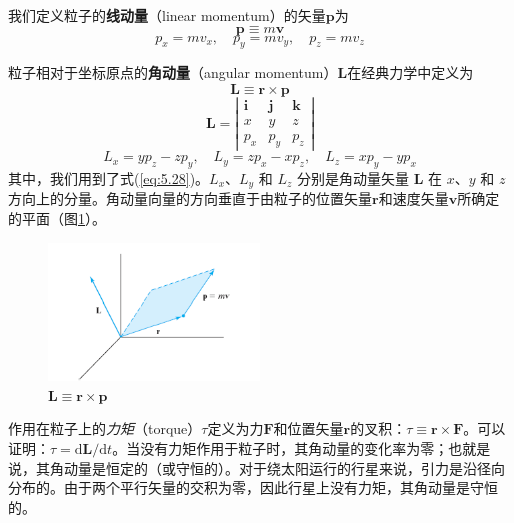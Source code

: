     我们定义粒子的\textbf{线动量}（linear momentum）的矢量$\mathbf{p}$为
    \begin{equation}
        \boxed{
            \mathbf{p} \equiv m\mathbf{v}
        }
        \label{eq:5.35}
    \end{equation}
    \begin{equation}
        p_x = mv_x, \quad p_y = mv_y, \quad p_z = mv_z
        \label{eq:5.36}
    \end{equation}

    粒子相对于坐标原点的\textbf{角动量}（angular momentum）$\mathbf{L}$在经典力学中定义为
    \begin{equation}
        \boxed{
            \mathbf{L} \equiv \mathbf{r} \times \mathbf{p}
        }
        \label{eq:5.37}
    \end{equation}
    \begin{equation}
        \mathbf{L} = \left|
            \begin{array}{ccc}
            \mathbf{i} & \mathbf{j} & \mathbf{k} \\
            x & y & z \\
            p_x & p_y & p_z
            \end{array}
            \right|
        \label{eq:5.38}
    \end{equation}
    \begin{equation}
        L_x = yp_z - zp_y, \quad L_y = zp_x - xp_z, \quad L_z = xp_y - yp_x
        \label{eq:5.39}
    \end{equation}
    其中，我们用到了式(\ref{eq:5.28})。$L_x$、$L_y$ 和 $L_z$ 分别是角动量矢量 $\mathbf{L}$ 在 $x$、$y$ 和 $z$ 方向上的分量。角动量向量的方向垂直于由粒子的位置矢量$\mathbf{r}$和速度矢量$\mathbf{v}$所确定的平面（图\ref{fig:5.4}）。
    \begin{figure}[h!]
        \centering
        \includegraphics[width=0.5\textwidth]{Figures/5.4.png}
        \caption{$\mathbf{L \equiv \mathbf{r} \times \mathbf{p}}$}
        \label{fig:5.4}
    \end{figure}

    作用在粒子上的\textit{力矩}（torque）$\tau$定义为力$\mathbf{F}$和位置矢量$\mathbf{r}$的叉积：$\tau \equiv \mathbf{r} \times \mathbf{F}$。可以证明：$\tau = \mathrm{d}\mathbf{L} / \mathrm{d}t$。当没有力矩作用于粒子时，其角动量的变化率为零；也就是说，其角动量是恒定的（或守恒的）。对于绕太阳运行的行星来说，引力是沿径向分布的。由于两个平行矢量的交积为零，因此行星上没有力矩，其角动量是守恒的。

